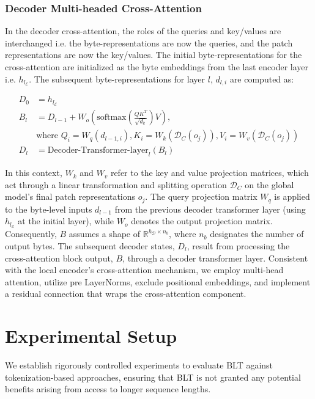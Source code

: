 \subsubsection{Decoder Multi-headed Cross-Attention} 

In the decoder cross-attention, the roles of the queries and key/values are interchanged i.e. the byte-representations are now the queries, and the patch representations are now the key/values. The initial byte-representations for the cross-attention are initialized as the byte embeddings from the last encoder layer i.e. $h_{l_{\mathcal{E}}}$. The subsequent byte-representations for layer $l$, $d_{l,i}$ are computed as:

\begin{align}
D_0 &= h_{l_{\mathcal{E}}} \\
B_l &= D_{l-1} + W_o\left(\text{softmax}\left(\frac{QK^T}{\sqrt{d_k}}\right)V\right), \\
  &\text{where } Q_i = W_q(d_{l-1,i}), K_i = W_k(\mathcal{D}_C(o_j)), V_i = W_v(\mathcal{D}_C(o_j)) \\
  D_l &= \text{Decoder-Transformer-layer}_l(B_l)
\end{align}

In this context, $W_k$ and $W_v$ refer to the key and value projection matrices, which act through a linear transformation and splitting operation $\mathcal{D}_C$ on the global model's final patch representations $o_j$. The query projection matrix $W_q$ is applied to the byte-level inputs $d_{l-1}$ from the previous decoder transformer layer (using $h_{l_{\mathcal{E}}}$ at the initial layer), while $W_o$ denotes the output projection matrix. Consequently, $B$ assumes a shape of $\mathbb{R}^{h_{\mathcal{D}} \times n_b}$, where $n_b$ designates the number of output bytes. The subsequent decoder states, $D_l$, result from processing the cross-attention block output, $B$, through a decoder transformer layer. Consistent with the local encoder's cross-attention mechanism, we employ multi-head attention, utilize pre LayerNorms, exclude positional embeddings, and implement a residual connection that wraps the cross-attention component.

\section{Experimental Setup}
\label{section:experiments}
We establish rigorously controlled experiments to evaluate {\textsc BLT} against tokenization-based approaches, ensuring that {\textsc BLT} is not granted any potential benefits arising from access to longer sequence lengths.

